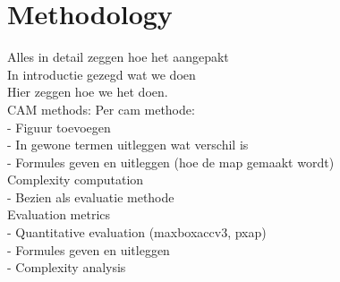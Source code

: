\chapter{Methodology}

Alles in detail zeggen hoe het aangepakt \\
In introductie gezegd wat we doen \\
Hier zeggen hoe we het doen. \\
CAM methods: Per cam methode: \\
- Figuur toevoegen \\
- In gewone termen uitleggen wat verschil is \\
- Formules geven en uitleggen (hoe de map gemaakt wordt) \\
Complexity computation \\
- Bezien als evaluatie methode \\
Evaluation metrics \\
- Quantitative evaluation (maxboxaccv3, pxap) \\
- Formules geven en uitleggen \\
- Complexity analysis \\


